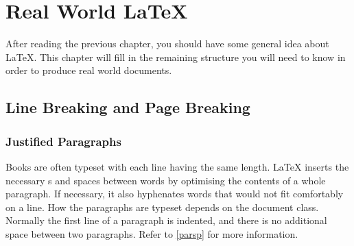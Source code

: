 %
%
%
%


\chapter{Real World \LaTeX{}}\label{chap:realworld}

\begin{intro}
  After reading the previous chapter, you should have some general idea
  about \LaTeX{}. This chapter
  will fill in the remaining structure you will need to know in order
  to produce real world documents.
\end{intro}

\section{Line Breaking and Page Breaking}

\subsection{Justified Paragraphs}

Books are often typeset with each line having the same length.
\LaTeX{} inserts the necessary s and spaces between words
by optimising the contents of a whole paragraph. If necessary, it
also hyphenates words that would not fit comfortably on a line.
How the paragraphs are typeset depends on the document class.
Normally the first line of a paragraph is indented, and there is no
additional space between two paragraphs. Refer to \autoref{parsp}
for more information.


